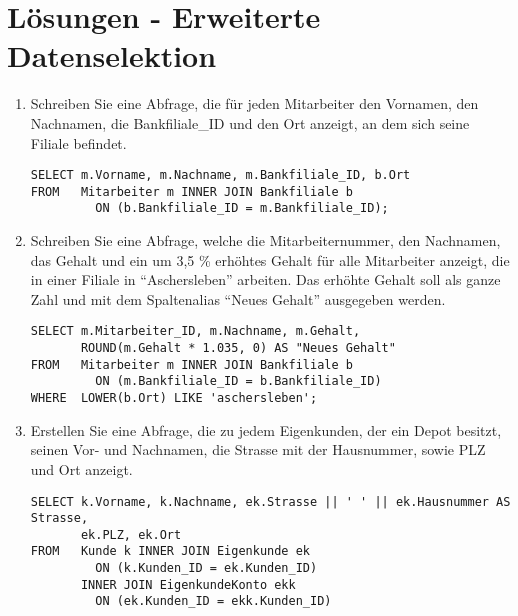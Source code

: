 \clearpage
    \section{Lösungen - Erweiterte Datenselektion}
      \begin{enumerate}
        \item Schreiben Sie eine Abfrage, die für jeden Mitarbeiter den
        Vornamen, den Nachnamen, die Bankfiliale\_ID und den Ort anzeigt, an dem
        sich seine Filiale befindet.
        \begin{msoraclesql}[\FALSE]
        \end{msoraclesql}
        \begin{lstlisting}[language=oracle_sql]
SELECT m.Vorname, m.Nachname, m.Bankfiliale_ID, b.Ort
FROM   Mitarbeiter m INNER JOIN Bankfiliale b
         ON (b.Bankfiliale_ID = m.Bankfiliale_ID);
        \end{lstlisting}
        \item Schreiben Sie eine Abfrage, welche die Mitarbeiternummer, den
        Nachnamen, das Gehalt und ein um 3,5 \% erhöhtes Gehalt für alle
        Mitarbeiter anzeigt, die in einer Filiale in \enquote{Aschersleben}
        arbeiten. Das erhöhte Gehalt soll als ganze Zahl und mit dem
        Spaltenalias \enquote{Neues Gehalt} ausgegeben werden.
        \begin{msoraclesql}[\FALSE]
        \end{msoraclesql}
        \begin{lstlisting}[language=oracle_sql]
SELECT m.Mitarbeiter_ID, m.Nachname, m.Gehalt,
       ROUND(m.Gehalt * 1.035, 0) AS "Neues Gehalt"
FROM   Mitarbeiter m INNER JOIN Bankfiliale b
         ON (m.Bankfiliale_ID = b.Bankfiliale_ID)
WHERE  LOWER(b.Ort) LIKE 'aschersleben';
        \end{lstlisting}
        \item Erstellen Sie eine Abfrage, die zu jedem Eigenkunden, der ein
        Depot besitzt, seinen Vor- und Nachnamen, die Strasse mit der
        Hausnummer, sowie PLZ und Ort anzeigt.
        \begin{oraclesql}[\FALSE]
        \end{oraclesql}
        \begin{lstlisting}[language=oracle_sql]
SELECT k.Vorname, k.Nachname, ek.Strasse || ' ' || ek.Hausnummer AS Strasse,
       ek.PLZ, ek.Ort
FROM   Kunde k INNER JOIN Eigenkunde ek
         ON (k.Kunden_ID = ek.Kunden_ID)
       INNER JOIN EigenkundeKonto ekk
         ON (ek.Kunden_ID = ekk.Kunden_ID)

\end{lstlisting}
\end{enumerate}
